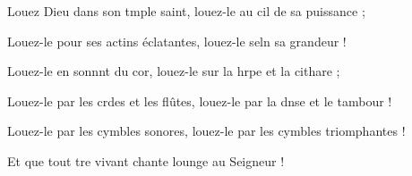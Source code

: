 \item Louez Dieu dans son tmple saint,\psstar{} louez-le au cil de sa puissance ;
\item Louez-le pour ses actins éclatantes,\psstar{} louez-le seln sa grandeur !
\item Louez-le en sonnnt du cor,\psstar{} louez-le sur la hrpe et la cithare ;
\item Louez-le par les crdes et les flûtes,\psstar{} louez-le par la dnse et le tambour !
\item Louez-le par les cymbles sonores,\psstar{} louez-le par les cymbles triomphantes !
\item Et que tout tre vivant\psstar{} chante lounge au Seigneur !